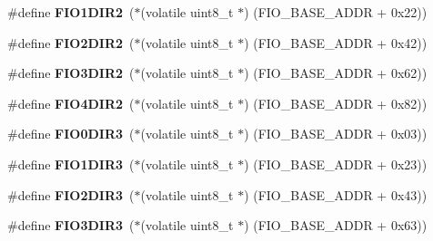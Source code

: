 \begin{DoxyCompactItemize}
\item 
\mbox{\label{group__lpc24xx__regs_gad4cbd7ccd3a8071640f1aa70e1b84a7f}} 
\#define {\bfseries F\+I\+O1\+D\+I\+R2}~($\ast$(volatile uint8\+\_\+t $\ast$) (F\+I\+O\+\_\+\+B\+A\+S\+E\+\_\+\+A\+D\+DR + 0x22))
\item 
\mbox{\label{group__lpc24xx__regs_ga8ea51f180c8cb3805e3c90044ed347d9}} 
\#define {\bfseries F\+I\+O2\+D\+I\+R2}~($\ast$(volatile uint8\+\_\+t $\ast$) (F\+I\+O\+\_\+\+B\+A\+S\+E\+\_\+\+A\+D\+DR + 0x42))
\item 
\mbox{\label{group__lpc24xx__regs_ga1a2e932c711dcc7ecb0184960fe6f347}} 
\#define {\bfseries F\+I\+O3\+D\+I\+R2}~($\ast$(volatile uint8\+\_\+t $\ast$) (F\+I\+O\+\_\+\+B\+A\+S\+E\+\_\+\+A\+D\+DR + 0x62))
\item 
\mbox{\label{group__lpc24xx__regs_ga0822392d43703e9465dca05f0ec1e15e}} 
\#define {\bfseries F\+I\+O4\+D\+I\+R2}~($\ast$(volatile uint8\+\_\+t $\ast$) (F\+I\+O\+\_\+\+B\+A\+S\+E\+\_\+\+A\+D\+DR + 0x82))
\item 
\mbox{\label{group__lpc24xx__regs_ga8c8521bfec602f183efe5b47b2ed3a15}} 
\#define {\bfseries F\+I\+O0\+D\+I\+R3}~($\ast$(volatile uint8\+\_\+t $\ast$) (F\+I\+O\+\_\+\+B\+A\+S\+E\+\_\+\+A\+D\+DR + 0x03))
\item 
\mbox{\label{group__lpc24xx__regs_ga6db1499e58ca946b6eff6ce343e67db4}} 
\#define {\bfseries F\+I\+O1\+D\+I\+R3}~($\ast$(volatile uint8\+\_\+t $\ast$) (F\+I\+O\+\_\+\+B\+A\+S\+E\+\_\+\+A\+D\+DR + 0x23))
\item 
\mbox{\label{group__lpc24xx__regs_gad7b5dc8c40c055c156ce404bc0107618}} 
\#define {\bfseries F\+I\+O2\+D\+I\+R3}~($\ast$(volatile uint8\+\_\+t $\ast$) (F\+I\+O\+\_\+\+B\+A\+S\+E\+\_\+\+A\+D\+DR + 0x43))
\item 
\mbox{\label{group__lpc24xx__regs_ga6874a477197f78f8c2cc972504c0e048}} 
\#define {\bfseries F\+I\+O3\+D\+I\+R3}~($\ast$(volatile uint8\+\_\+t $\ast$) (F\+I\+O\+\_\+\+B\+A\+S\+E\+\_\+\+A\+D\+DR + 0x63))
\item 
\mbox{\label{group__lpc24xx__regs_ga7cacd6b16884af9f0d85a723d8770f40}} 

\end{DoxyCompactItemize}
